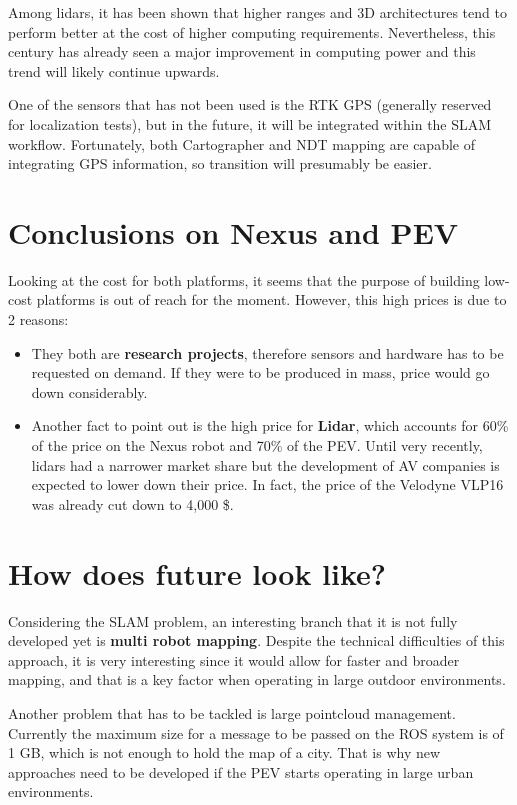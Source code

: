 Among lidars, it has been shown that higher ranges and 3D architectures tend to perform better at the cost of higher computing requirements. Nevertheless, this century has already seen a major improvement in computing power and this trend will likely continue upwards.

One of the sensors that has not been used is the RTK GPS (generally reserved for localization tests), but in the future, it will be integrated within the SLAM workflow. Fortunately, both Cartographer and NDT mapping are capable of integrating GPS information, so transition will presumably be easier.

\section{Conclusions on Nexus and PEV}

Looking at the cost for both platforms, it seems that the purpose of building low-cost platforms is out of reach for the moment. However, this high prices is due to 2 reasons:

\begin{itemize}
  \item They both are \textbf{research projects}, therefore sensors and hardware has to be requested on demand. If they were to be produced in mass, price would go down considerably.

  \item Another fact to point out is the high price for \textbf{Lidar}, which accounts for 60\% of the price on the Nexus robot and  70\% of the PEV. Until very recently, lidars had a narrower market share but the development of AV companies is expected to lower down their price. In fact, the price of the Velodyne VLP16 was already cut down to 4,000 \$.
\end{itemize}

\section{How does future look like?}
Considering the SLAM problem, an interesting branch that it is not fully developed yet is \textbf{multi robot mapping}. Despite the technical difficulties of this approach, it is very interesting since it would allow for faster and broader mapping, and that is a key factor when operating in large outdoor environments.

Another problem that has to be tackled is large pointcloud management. Currently the maximum size for a message to be passed on the ROS system is of 1 GB, which is not enough to hold the map of a city. That is why new approaches need to be developed if the PEV starts operating in large urban environments.

